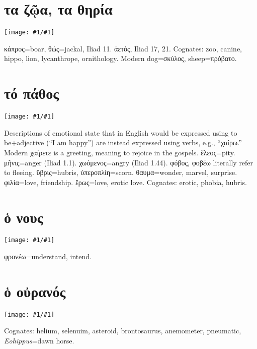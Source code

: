 \documentclass[12pt,openany]{book}
\newenvironment{notes}{\vfill\scriptsize\begin{flushright}}{\end{flushright}}
\newcommand{\fig}[1]{\begin{center}\texttt{[image: \#1/\#1]}\end{center}}
\begin{document}

\chapter{τα ζῷα, τα θηρία}

\fig{animals} %

\begin{notes}
κάπρος=boar,  θώς=jackal, Iliad 11.  ἀετός, Iliad 17, 21. Cognates: zoo, canine, hippo, lion, lycanthrope, ornithology.
Modern dog=σκύλος, sheep=πρόβατο. 
\end{notes}


\chapter{τό πάθος}

\fig{emotions}

\begin{notes}
Descriptions of emotional state that in English would be expressed using to be+adjective (``I am happy'') are
instead expressed using verbs, e.g., ``χαίρω.''
Modern χαίρετε is a greeting, meaning to rejoice in the gospels.
ἕλεος=pity. μῆνις=anger (Iliad 1.1). χωόμενος=angry (Iliad 1.44).
φόβος, φοβέω literally refer to fleeing. ὕβρις=hubris, ὑπεροπλίη=scorn.
θαυμα=wonder, marvel, surprise. φιλία=love, friendship. ἕρως=love, erotic love.
Cognates: erotic, phobia, hubris.
\end{notes}


\chapter{ὁ νους}

\fig{mind}

\begin{notes}
φρονέω=understand, intend.
\end{notes}


\chapter{ὁ οὐρανός}

\fig{sky}

\begin{notes}
Cognates: helium, selenuim, asteroid, brontosaurus, anemometer, pneumatic, \emph{Eohippus}=dawn horse.
\end{notes}
\end{document}
